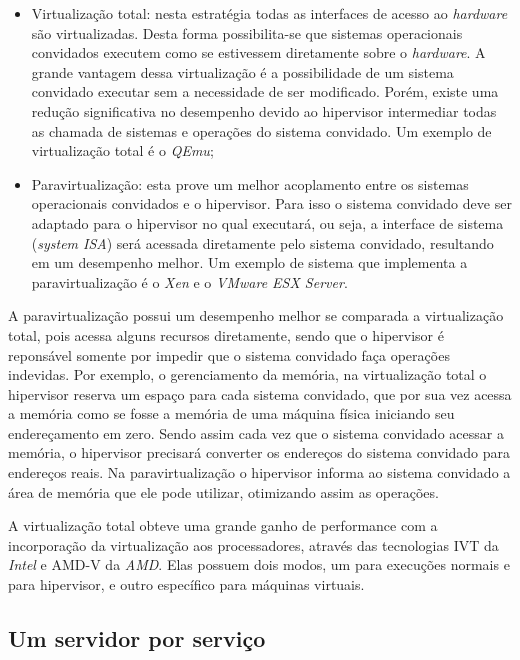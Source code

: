 \begin{itemize}
 \item Virtualização total: nesta estratégia todas as interfaces de acesso ao \textit{hardware} são virtualizadas. Desta forma
 possibilita-se que sistemas operacionais convidados executem como se estivessem diretamente sobre o \textit{hardware}. A grande
 vantagem dessa virtualização é a possibilidade de um sistema convidado executar sem a necessidade de ser modificado. Porém, existe uma 
 redução significativa no desempenho devido ao hipervisor intermediar todas as chamada de sistemas e operações do sistema convidado.
 Um exemplo de virtualização total é o \textit{QEmu};
 \item Paravirtualização: esta prove um melhor acoplamento entre os sistemas operacionais convidados e o hipervisor. Para isso o sistema
 convidado deve ser adaptado para o hipervisor no qual executará, ou seja, a interface de sistema (\textit{system ISA}) será acessada
 diretamente pelo sistema convidado, resultando em um desempenho melhor. Um exemplo de sistema que implementa a paravirtualização é o 
 \textit{Xen} e o \textit{VMware ESX Server}.
\end{itemize}

A paravirtualização possui um desempenho melhor se comparada a virtualização total, pois acessa alguns recursos diretamente, sendo que 
o hipervisor é reponsável somente por impedir que o sistema convidado faça operações indevidas. Por exemplo, o gerenciamento da memória, 
na virtualização total o hipervisor reserva um espaço para cada sistema convidado, que por sua vez acessa a memória como se fosse a memória 
de uma máquina física iniciando seu endereçamento em zero. Sendo assim cada vez que o sistema convidado acessar a memória, o hipervisor 
precisará converter os endereços do sistema convidado para endereços reais. Na paravirtualização o hipervisor informa ao sistema 
convidado a área de memória que ele pode utilizar, otimizando assim as operações.

A virtualização total obteve uma grande ganho de performance com a incorporação da virtualização aos processadores, através das 
tecnologias \ac{IVT} da \textit{Intel} e \ac{AMD-V} da \textit{AMD}. Elas possuem dois modos, um para execuções normais e para hipervisor, 
e outro específico para máquinas virtuais. 

\subsection{Um servidor por serviço}
\label{section:virtserv}

